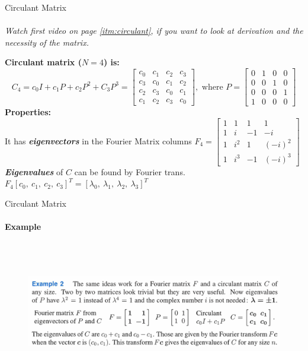 \documentclass[aspectratio=169]{beamer}
\begin{document}
\begin{frame}[t]{Circulant Matrix}
\framesubtitle{}
\textit{Watch first video on page \ref{itm:circulant}, if you want to look at derivation and the necessity of the matrix. }

\textbf{Circulant matrix ($N=4$) is:}
\begin{equation*}
    C_4 = c_0I+ c_1P + c_2P^2 + C_3P^3 = \begin{bmatrix}
    c_0 & c_1 & c_2 & c_3\\
    c_3 & c_0 & c_1 & c_2 \\ 
    c_2 & c_3  & c_0 & c_1 \\
    c_1 & c_2  & c_3 & c_0 
    \end{bmatrix}, \text{ where } P = \begin{bmatrix}
    0 & 1 & 0 & 0\\
    0 & 0 & 1 & 0 \\ 
    0 & 0  & 0 & 1 \\
    1 & 0  & 0 & 0 
    \end{bmatrix}
\end{equation*}
\textbf{Properties:} \\ 
It has \textbf{\textit{eigenvectors}} in the Fourier Matrix columns $F_4 = \begin{bmatrix}
1 & 1 & 1 & 1\\
1 & i & -1 & -i \\ 
1 & i^2  & 1 & (-i)^2 \\
1 & i^3  & -1 & (-i)^3 
\end{bmatrix}$ \\

\textit{\textbf{Eigenvalues}} of $C$ can be found by Fourier trans. $F_4[c_0,\ c_1,\ c_2,\ c_3]^T = [\lambda_0,\ \lambda_1,\ \lambda_2,\ \lambda_3]^T$
\end{frame}

\begin{frame}[t]{Circulant Matrix}
\framesubtitle{Example}
    \begin{figure}[H]
        \centering\includegraphics[height=6cm,width=1\textwidth,keepaspectratio]{circ_22.png}
        \label{fig:circ_22.png}
    \end{figure}
\end{frame}
\end{document}
